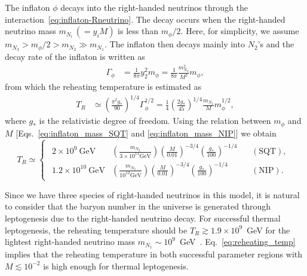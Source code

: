 \documentclass[11pt,a4paper]{article}
\begin{document}
The inflaton $\phi$ decays into the right-handed neutrinos through the interaction~\eqref{eq:inflaton-Rneutrino}.
The decay occurs when the right-handed neutrino mass $m_{N_i}\, (= y_i M)$ is less than $m_\phi/2$.
Here, for simplicity, we assume $m_{N_3}  > m_\phi/2 > m_{N_2}\gg m_{N_1}$.
The inflaton then decays mainly into $N_{2}$'s and the decay rate of the inflaton is written as
\begin{align}
    \Gamma_\phi & = \frac{1}{8\pi} y_2^2  m_\phi 
    = \frac{1}{8\pi}\frac{m_{N_2}^2}{M^2}m_\phi,
\end{align}
from which the reheating temperature is estimated as 
\begin{align}
    T_R & \simeq \left(\frac{\pi^2 g_*}{90}\right)^{1/4}
    \Gamma_\phi^{1/2}
    = \frac{1}{4}\left(\frac{2 g_*}{45}\right)^{1/4}
    \frac{m_{N_2}}{M}m_\phi^{1/2} ,
\end{align}
where $g_*$ is the relativistic degree of freedom.
Using the relation between $m_\phi$ and $M$ [Eqs.~\eqref{eq:inflaton_mass_SQT} and \eqref{eq:inflaton_mass_NIP}] we obtain
\begin{equation}
    \label{eq:reheating_temp}
    T_R \simeq 
    \begin{cases}
    \begin{aligned}
        2\times 10^{9}~\mathrm{GeV}&
        \left(\frac{m_{N_2}}{3 \times 10^{11}\mathrm{GeV}}\right)
        \left(\frac{M}{0.01}\right)^{-3/4}
        \left(\frac{g_*}{100}\right)^{-1/4}
        & ~~~~(\mathrm{SQT}) ,\\[0.5em]
        1.2\times 10^{10}~\mathrm{GeV}&
        \left(\frac{m_{N_2}}{10^{12}\mathrm{GeV}}\right)
        \left(\frac{M}{0.01}\right)^{-3/4}
        \left(\frac{g_*}{100}\right)^{-1/4}
        & ~~~~(\mathrm{NIP}).
    \end{aligned}    
    \end{cases}
\end{equation}

Since we have three species of right-handed neutrinos in this model, it is natural to consider that the baryon number in the universe is generated through leptogenesis due to the right-handed neutrino decay.
For successful thermal leptogenesis, the reheating temperature should be $T_R \gtrsim 1.9\times 10^9$~GeV for the lightest right-handed neutrino mass $m_{N_1} \sim 10^{9}$~GeV~\cite{Antusch:2006gy}.
Eq.~\eqref{eq:reheating_temp} implies that the reheating temperature in both successful parameter regions with $M \lesssim 10^{-2}$ is high enough for thermal leptogenesis. 
\end{document}
